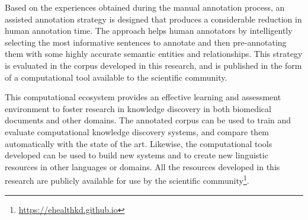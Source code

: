 Based on the experiences obtained during the manual annotation process, an assisted annotation strategy is designed that produces a considerable reduction in human annotation time.
The approach helps human annotators by intelligently selecting the most informative sentences to annotate and then pre-annotating them with some highly accurate semantic entities and relationships.
This strategy is evaluated in the corpus developed in this research, and is published in the form of a computational tool available to the scientific community.

This computational ecosystem provides an effective learning and assessment environment to foster research in knowledge discovery in both biomedical documents and other domains. The annotated corpus can be used to train and evaluate computational knowledge discovery systems, and compare them automatically with the state of the art. Likewise, the computational tools developed can be used to build new systems and to create new linguistic resources in other languages or domains. All the resources developed in this research are publicly available for use by the scientific community\footnote{\url{https://ehealthkd.github.io}}.